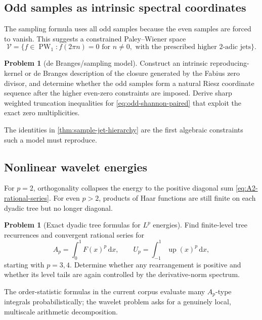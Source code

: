 \documentclass[11pt,oneside]{article}
\theoremstyle{definition}
\newtheorem{problem}[theorem]{Problem}
\theoremstyle{remark}
\newcommand{\Up}{\operatorname{up}}
\newcommand{\dd}{\,\mathrm d}
\newcommand{\1}{\mathbf 1}
\newcommand{\PW}{\operatorname{PW}}
\begin{document}
\subsection{Odd samples as intrinsic spectral coordinates}

The sampling formula uses all odd samples because the even samples are forced
to vanish.  This suggests a constrained Paley--Wiener space
\begin{equation}
 \mathcal V=\{f\in\PW_1:f(2\pi n)=0\text{ for }n\ne0,
 \text{ with the prescribed higher }2\text{-adic jets}\}.              \label{eq:constrained-PW}
\end{equation}

\begin{problem}[de Branges/sampling model]
Construct an intrinsic reproducing-kernel or de Branges description of the
closure generated by the Fabius zero divisor, and determine whether the odd
samples form a natural Riesz coordinate sequence after the higher even-zero
constraints are imposed.  Derive sharp weighted truncation inequalities for
\eqref{eq:odd-shannon-paired} that exploit the exact zero multiplicities.
\end{problem}

The identities in \cref{thm:sample-jet-hierarchy} are the first algebraic
constraints such a model must reproduce.

\subsection{Nonlinear wavelet energies}

For $p=2$, orthogonality collapses the energy to the positive diagonal sum
\eqref{eq:A2-rational-series}.  For even $p>2$, products of Haar functions are
still finite on each dyadic tree but no longer diagonal.

\begin{problem}[Exact dyadic tree formulas for $L^p$ energies]
Find finite-level tree recurrences and convergent rational series for
\[
 A_p=\int_0^1F(x)^p\dd x,
 \qquad
 U_p=\int_{-1}^{1}\Up(x)^p\dd x,
\]
starting with $p=3,4$.  Determine whether any rearrangement is positive and
whether its level tails are again controlled by the derivative-norm spectrum.
\end{problem}

The order-statistic formulas in the current corpus evaluate many $A_p$-type
integrals probabilistically; the wavelet problem asks for a genuinely local,
multiscale arithmetic decomposition.
\end{document}

